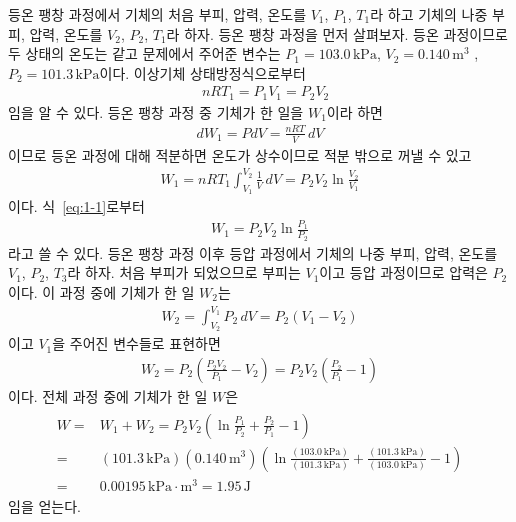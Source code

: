 \documentclass[floatfix,nofootinbib,superscriptaddress,fleqn]{revtex4}
\begin{document}
등온 팽창 과정에서
기체의 처음 부피, 압력, 온도를 $V_1$, $P_1$, $T_1$라 하고
기체의 나중 부피, 압력, 온도를 $V_2$, $P_2$, $T_1$라 하자. 
등온 팽창 과정을 먼저 살펴보자. 
등온 과정이므로 두 상태의 온도는 같고 문제에서 주어준 변수는
$P_1 = 103.0\,\mathrm{kPa}$, $V_2 = 0.140\,\mathrm{m^3}$
,$P_2 = 101.3\,\mathrm{kPa}$이다.
이상기체 상태방정식으로부터
\begin{align}\label{eq:1-1}
    & nRT_1=P_1V_1=P_2V_2
\end{align}
임을 알 수 있다.
등온 팽창 과정 중 기체가 한 일을 $W_1$이라 하면
\begin{align}
  dW_1 = PdV = \frac{nRT}{V}\,dV
\end{align}
이므로 등온 과정에 대해 적분하면 온도가 상수이므로 적분 밖으로 꺼낼 수 있고
\begin{align}
  W_1 = nRT_1\int^{V_2}_{V_1}\frac{1}{V}\,dV
  = P_2V_2 \ln\frac{V_2}{V_1}
\end{align}
이다. 식~\eqref{eq:1-1}로부터
\begin{align}
  W_1 =P_2V_2 \ln\frac{P_1}{P_2} 
\end{align}
라고 쓸 수 있다.
등온 팽창 과정 이후 등압 과정에서 기체의 나중 부피, 압력, 온도를 $V_1$, $P_2$, $T_3$라 하자.
처음 부피가 되었으므로 부피는 $V_1$이고 등압 과정이므로 압력은 $P_2$이다.
이 과정 중에 기체가 한 일 $W_2$는
\begin{align}
  W_2 = \int^{V_1}_{V_2}P_2\,dV = P_2(V_1-V_2)
\end{align}
이고 $V_1$을 주어진 변수들로 표현하면
\begin{align}
  W_2 = P_2\left(\frac{P_2V_2}{P_1}-V_2\right)
  =P_2V_2\left(\frac{P_2}{P_1}-1\right)
\end{align}
이다. 전체 과정 중에 기체가 한 일 $W$은
\begin{align}
  \begin{split}
    W=&W_1+W_2 =P_2V_2\left(\ln\frac{P_1}{P_2}+\frac{P_2}{P_1}-1\right) \\
    =&(101.3\,\mathrm{kPa})(0.140\,\mathrm{m^3})\left(
      \ln\frac{(103.0\,\mathrm{kPa})}{(101.3\,\mathrm{kPa})}
      +\frac{(101.3\,\mathrm{kPa})}{(103.0\,\mathrm{kPa})}-1\right) \\
     =& 0.00195\,\mathrm{kPa\cdot m^3} 
     =1.95\,\mathrm{J} 
  \end{split}
\end{align}
임을 얻는다.
\vspace{1cm}
\end{document}
